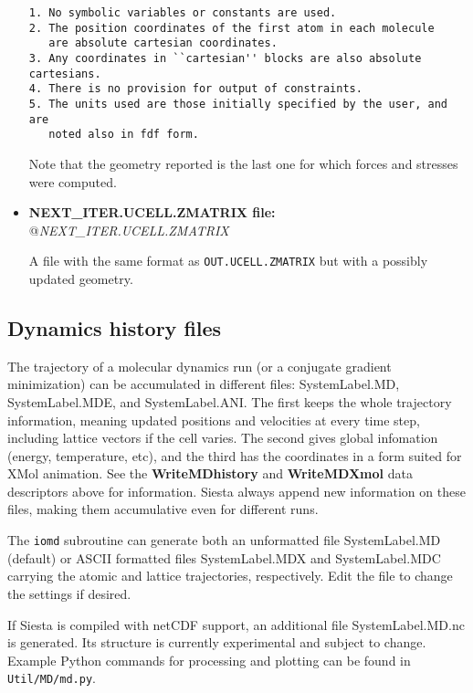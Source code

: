 \documentclass[11pt]{article}
\begin{document}
\begin{itemize}
\begin{verbatim}
1. No symbolic variables or constants are used.
2. The position coordinates of the first atom in each molecule
   are absolute cartesian coordinates.
3. Any coordinates in ``cartesian'' blocks are also absolute cartesians.
4. There is no provision for output of constraints.
5. The units used are those initially specified by the user, and are
   noted also in fdf form.
\end{verbatim}

Note that the geometry reported is the last one for which forces and
stresses were computed.

\item{\bf NEXT\_ITER.UCELL.ZMATRIX file:}
@{{\it NEXT\_ITER.UCELL.ZMATRIX}}

A file with the same format as {\tt OUT.UCELL.ZMATRIX} but with
a possibly updated geometry.

\end{itemize}


\subsection{Dynamics history files}
The trajectory of a molecular dynamics run (or a conjugate gradient
minimization) can be accumulated in different files: SystemLabel.MD,
SystemLabel.MDE, and SystemLabel.ANI. The first keeps the whole trajectory
information, meaning updated positions and velocities at every time step, 
including lattice vectors if the cell varies.
The second gives global infomation (energy, temperature, etc),
and the third has the coordinates in a form suited for XMol animation.
See the {\bf WriteMDhistory} and {\bf WriteMDXmol} data descriptors 
above for information. {\sc Siesta} always append new information on these
files, making them accumulative even for different runs.

The {\tt iomd} subroutine can generate both
an unformatted file SystemLabel.MD (default) or  ASCII formatted files
SystemLabel.MDX and SystemLabel.MDC carrying the atomic and lattice
trajectories, respectively. Edit the file to change the settings if desired.

If {\sc Siesta} is compiled with netCDF support, an additional file
SystemLabel.MD.nc is generated. Its structure is currently
experimental and subject to change. Example Python commands for
processing and plotting can be found in {\tt
Util/MD/md.py}.
\end{document}
